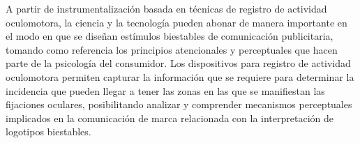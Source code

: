 \documentclass[spanish]{textolivre}
\begin{document}
A partir de instrumentalización basada en técnicas de registro de actividad oculomotora, la ciencia y la tecnología pueden abonar de manera importante en el modo en que se diseñan estímulos biestables de comunicación publicitaria, tomando como referencia los principios atencionales y perceptuales que hacen parte de la psicología del consumidor. Los dispositivos para registro de actividad oculomotora permiten capturar la información que se requiere para determinar la incidencia que pueden llegar a tener las zonas en las que se manifiestan las fijaciones oculares, posibilitando analizar y comprender mecanismos perceptuales implicados en la comunicación de marca relacionada con la interpretación de logotipos biestables.



\printbibliography\label{sec-bib}
\end{document}
